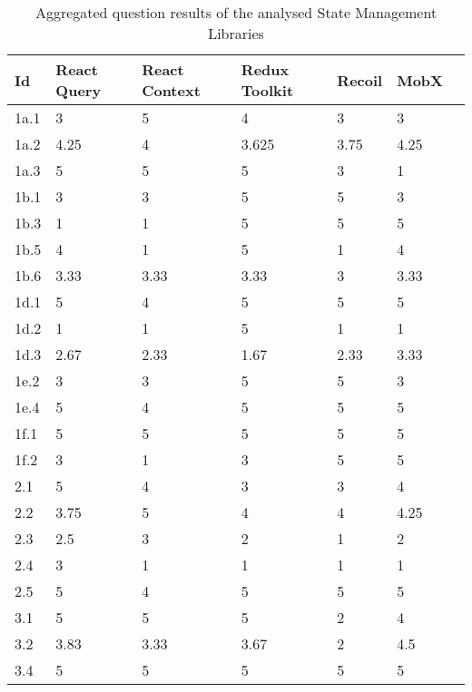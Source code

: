 \begin{longtable}[]{|p{1cm}p{2.5cm}p{1.5cm}p{1.5cm}p{1.5cm}p{1.5cm}p{2cm}|}
    \caption{Aggregated question results of the analysed State Management Libraries}
    \label{table:results_questions}\\
    \toprule Id & React Query & React Context & Redux Toolkit & Recoil &
MobX \\
\midrule
\endhead
1a.1 & 3 & 5 & 4 & 3 & 3 \\
1a.2 & 4.25 & 4 & 3.625 & 3.75 & 4.25 \\
1a.3 & 5 & 5 & 5 & 3 & 1 \\
1b.1 & 3 & 3 & 5 & 5 & 3 \\
1b.3 & 1 & 1 & 5 & 5 & 5 \\
1b.5 & 4 & 1 & 5 & 1 & 4 \\
1b.6 & 3.33 & 3.33 & 3.33 & 3 & 3.33 \\
1d.1 & 5 & 4 & 5 & 5 & 5 \\
1d.2 & 1 & 1 & 5 & 1 & 1 \\
1d.3 & 2.67 & 2.33 & 1.67 & 2.33 & 3.33 \\
1e.2 & 3 & 3 & 5 & 5 & 3 \\
1e.4 & 5 & 4 & 5 & 5 & 5 \\
1f.1 & 5 & 5 & 5 & 5 & 5 \\
1f.2 & 3 & 1 & 3 & 5 & 5 \\
2.1 & 5 & 4 & 3 & 3 & 4 \\
2.2 & 3.75 & 5 & 4 & 4 & 4.25 \\
2.3 & 2.5 & 3 & 2 & 1 & 2 \\
2.4 & 3 & 1 & 1 & 1 & 1 \\
2.5 & 5 & 4 & 5 & 5 & 5 \\
3.1 & 5 & 5 & 5 & 2 & 4 \\
3.2 & 3.83 & 3.33 & 3.67 & 2 & 4.5 \\
3.4 & 5 & 5 & 5 & 5 & 5 \\
\bottomrule
\end{longtable}
